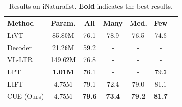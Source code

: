 \begin{table}[!t]
\centering
\caption{Results on iNaturalist. \textbf{Bold} indicates the best results.}
\label{tab:inat}
\footnotesize
\begin{tabular}{l|c|ccccc}
\toprule
\textbf{Method}  & \textbf{Param.} & \textbf{All} & \textbf{Many} & \textbf{Med.} & \textbf{Few} \\
\midrule
LiVT~\cite{xu2023learning}    & 85.80M              & 76.1          & 78.9          & 76.5          & 74.8          \\
Decoder~\cite{wang2024exploring} & 21.26M         & 59.2          & -             & -             & -             \\
VL-LTR~\cite{tian2022vl}  & 149.62M        & 76.8          & -             & -             & -             \\
LPT~\cite{dong2023lpt}   & \textbf{1.01M} & 76.1          & -             & -             & 79.3          \\
LIFT~\cite{shi2024long}  & 4.75M          & 79.1          & 72.4          & 79.0          & 81.1          \\
\midrule
CUE (Ours)               & 4.75M          & \textbf{79.6} & \textbf{73.4} & \textbf{79.2} & \textbf{81.7} \\
\bottomrule
\end{tabular}
\vspace{-2em}
\end{table}

